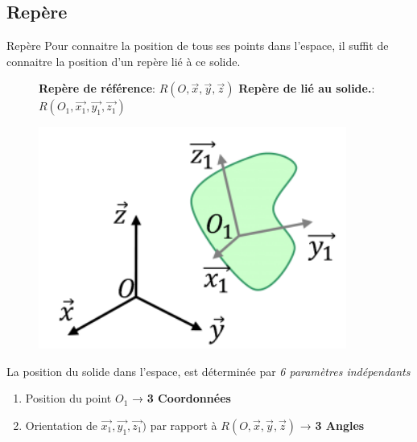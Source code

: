 \documentclass[
  ignorenonframetext,
  aspectratio=169,
  c]{beamer}
\providecommand{\tightlist}{%
  \setlength{\itemsep}{0pt}\setlength{\parskip}{0pt}}\usepackage{longtable,booktabs,array}
\begin{document}
\subsection{Repère}\label{repuxe8re}

\begin{frame}{Repère}
Pour connaitre la position de tous ses points dans l'espace, il suffit
de connaitre la position d'un repère lié à ce solide.

\begin{figure}

\begin{minipage}{0.60\linewidth}
\textbf{Repère de référence}: \(R(O, \vec{x}, \vec{y}, \vec{z})\)
\textbf{Repère de lié au solide.}:
\(R(O_1, \vec{x_1}, \vec{y_1}, \vec{z_1})\)\end{minipage}%
%
\begin{minipage}{0.40\linewidth}
\begin{center}
\includegraphics[width=0.9\textwidth,height=\textheight]{CM3/Repere.png}
\end{center}
\end{minipage}%

\end{figure}%

\pause

La position du solide dans l'espace, est déterminée par \emph{6
paramètres indépendants}

\begin{enumerate}
\tightlist
\item
  Position du point \(O_1\) → \textbf{3 Coordonnées}
\item
  Orientation de \(\vec{x_1}, \vec{y_1}, \vec{z_1})\) par rapport à
  \(R(O, \vec{x}, \vec{y}, \vec{z})\) → \textbf{3 Angles}
\end{enumerate}
\end{frame}
\end{document}
